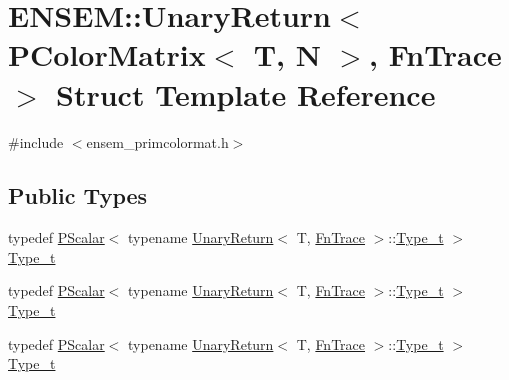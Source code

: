 \hypertarget{structENSEM_1_1UnaryReturn_3_01PColorMatrix_3_01T_00_01N_01_4_00_01FnTrace_01_4}{}\section{E\+N\+S\+EM\+:\+:Unary\+Return$<$ P\+Color\+Matrix$<$ T, N $>$, Fn\+Trace $>$ Struct Template Reference}
\label{structENSEM_1_1UnaryReturn_3_01PColorMatrix_3_01T_00_01N_01_4_00_01FnTrace_01_4}


{\ttfamily \#include $<$ensem\+\_\+primcolormat.\+h$>$}

\subsection*{Public Types}
\begin{DoxyCompactItemize}
\item 
typedef \mbox{\hyperlink{classENSEM_1_1PScalar}{P\+Scalar}}$<$ typename \mbox{\hyperlink{structENSEM_1_1UnaryReturn}{Unary\+Return}}$<$ T, \mbox{\hyperlink{structENSEM_1_1FnTrace}{Fn\+Trace}} $>$\+::\mbox{\hyperlink{structENSEM_1_1UnaryReturn_3_01PColorMatrix_3_01T_00_01N_01_4_00_01FnTrace_01_4_a828cd28979c532a4fc47110bdc5d9fdb}{Type\+\_\+t}} $>$ \mbox{\hyperlink{structENSEM_1_1UnaryReturn_3_01PColorMatrix_3_01T_00_01N_01_4_00_01FnTrace_01_4_a828cd28979c532a4fc47110bdc5d9fdb}{Type\+\_\+t}}
\item 
typedef \mbox{\hyperlink{classENSEM_1_1PScalar}{P\+Scalar}}$<$ typename \mbox{\hyperlink{structENSEM_1_1UnaryReturn}{Unary\+Return}}$<$ T, \mbox{\hyperlink{structENSEM_1_1FnTrace}{Fn\+Trace}} $>$\+::\mbox{\hyperlink{structENSEM_1_1UnaryReturn_3_01PColorMatrix_3_01T_00_01N_01_4_00_01FnTrace_01_4_a828cd28979c532a4fc47110bdc5d9fdb}{Type\+\_\+t}} $>$ \mbox{\hyperlink{structENSEM_1_1UnaryReturn_3_01PColorMatrix_3_01T_00_01N_01_4_00_01FnTrace_01_4_a828cd28979c532a4fc47110bdc5d9fdb}{Type\+\_\+t}}
\item 
typedef \mbox{\hyperlink{classENSEM_1_1PScalar}{P\+Scalar}}$<$ typename \mbox{\hyperlink{structENSEM_1_1UnaryReturn}{Unary\+Return}}$<$ T, \mbox{\hyperlink{structENSEM_1_1FnTrace}{Fn\+Trace}} $>$\+::\mbox{\hyperlink{structENSEM_1_1UnaryReturn_3_01PColorMatrix_3_01T_00_01N_01_4_00_01FnTrace_01_4_a828cd28979c532a4fc47110bdc5d9fdb}{Type\+\_\+t}} $>$ \mbox{\hyperlink{structENSEM_1_1UnaryReturn_3_01PColorMatrix_3_01T_00_01N_01_4_00_01FnTrace_01_4_a828cd28979c532a4fc47110bdc5d9fdb}{Type\+\_\+t}}
\end{DoxyCompactItemize}


